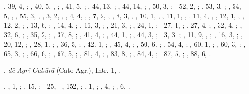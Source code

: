 \begin{autindex}
    , 39,  4, ;
    , 40,  5, , ;
    , 41,  5, ;
    , 44, 13, ;
    , 44, 14, ;
    , 50,  3, ;
    , 52,  2, ;
    , 53,  3, ;
    , 54,  5, ;
    , 55,  3, ;
    ,  3,  2, ;
    ,  4,  4, ;
    ,  7,  2, ;
    ,  8,  3, ;
    , 10,  1, ;
    , 11,  1, ;
    , 11,  4, ;
    , 12,  1, ;
    , 12,  2, ;
    , 13,  6, ;
    , 14,  4, ;
    , 16,  3, ;
    , 21,  3, ;
    , 24,  1, ;
    , 27,  1, ;
    , 27,  4, ;
    , 32,  4, ;
    , 32,  6, ;
    , 35,  2, ;
    , 37,  8, ;
    , 41,  4, ;
    , 44,  1, ;
    , 44,  3, ;
    ,  3,  3, ;
    , 11,  9, , ;
    , 16,  3, ;
    , 20, 12, ;
    , 28,  1, ;
    , 36,  5, ;
    , 42,  1, ;
    , 45,  4, ;
    , 50,  6, ;
    , 54,  4, ;
    , 60,  1, ;
    , 60,  3, ;
    , 65,  3, ;
    , 66,  6, ;
    , 67,  5, ;
    , 81,  4, ;
    , 83,  8, ;
    , 84,  4, ;
    , 87,  5, ; %
    , 88,  6, .

\indexspace

,
  \subitem \emph{dē Agrī Cultūrā} (Cato Agr.),
    \subsubitem Intr. 1, .

\indexspace

,
  ,   1, ;
  ,  15, ;
  ,  25, ;
  , 152, ;
  ,   1, ;
  ,   4, ;
  ,   6, .


\end{autindex}
